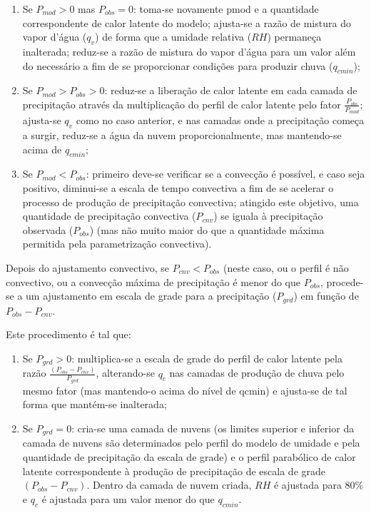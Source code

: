 \begin{enumerate}
\item Se $P_{mod}>0$ mas $P_{obs}=0$: toma-se novamente pmod e a quantidade correspondente de calor latente do modelo; ajusta-se a razão de mistura do vapor d'água ($q_{v}$) de forma que a umidade relativa ($RH$) permaneça inalterada; reduz-se a razão de mistura do vapor d'água para um valor além do necessário a fim de se proporcionar condições para produzir chuva ($q_{cmin}$);
\item Se $P_{mod}>P_{obs}>0$: reduz-se a liberação de calor latente em cada camada de precipitação através da multiplicação do perfil de calor latente pelo fator $\frac{P_{obs}}{P_{mod}}$; ajusta-se $q_{v}$ como no caso anterior, e nas camadas onde a precipitação começa a surgir, reduz-se a água da nuvem proporcionalmente, mas mantendo-se acima de $q_{cmin}$;
\item Se $P_{mod}<P_{obs}$: primeiro deve-se verificar se a convecção é possível, e caso seja positivo, diminui-se a escala de tempo convectiva a fim de se acelerar o processo de produção de precipitação convectiva; atingido este objetivo, uma quantidade de precipitação convectiva ($P_{cnv}$) se iguala à precipitação observada ($P_{obs}$) (mas não muito maior do que a quantidade máxima permitida pela parametrização convectiva).
\end{enumerate}

Depois do ajustamento convectivo, se $P_{cnv}<P_{obs}$ (neste caso, ou o perfil é não convectivo, ou a convecção máxima de precipitação é menor do que $P_{obs}$, procede-se a um ajustamento em escala de grade para a precipitação ($P_{grd}$) em função de $P_{obs}-P_{cnv}$.

Este procedimento é tal que:

\begin{enumerate}
\item Se $P_{grd}>0$: multiplica-se a escala de grade do perfil de calor latente pela razão $\frac{(P_{obs}-P_{cnv})}{P_{grd}}$, alterando-se $q_{c}$ nas camadas de produção de chuva pelo mesmo fator (mas mantendo-o acima do nível de qcmin) e ajusta-se de tal forma que mantém-se inalterada;
\item Se $P_{grd}=0$: cria-se uma camada de nuvens (os limites superior e inferior da camada de nuvens são determinados pelo perfil do modelo de umidade e pela quantidade de precipitação da escala de grade) e o perfil parabólico de calor latente correspondente à produção de precipitação de escala de grade $(P_{obs}-P_{cnv})$. Dentro da camada de nuvem criada, $RH$ é ajustada para 80\% e $q_{c}$ é ajustada para um valor menor do que $q_{cmin}$.
\end{enumerate}


